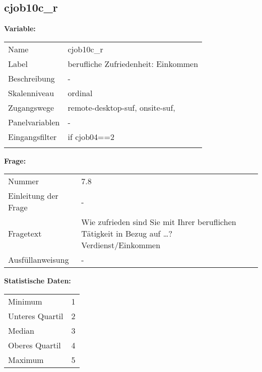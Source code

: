 	
	
	\subsection{cjob10c\_r}
	\label{subSection:cjob10c_r}

	\noindent\textbf{Variable:}\\
		\begin{tabular}{lL{11.3cm}}
			\label{tableVariable:cjob10c_r}
			Name & cjob10c\_r \\
			Label & berufliche Zufriedenheit: Einkommen \\
			Beschreibung & - \\
			Skalenniveau & ordinal \\
			Zugangswege &
				remote-desktop-suf,
				onsite-suf,
 \\
			Panelvariablen & -
			 \\
			Eingangsfilter & if cjob04==2 \\
 \\
		\end{tabular}

		\vspace*{1 cm}
		\noindent\textbf{Frage:}\\
		\begin{tabular}{lL{11.3cm}}
			\label{tableQuestion:cjob10c_r}
			Nummer & 7.8 \\
			Einleitung der Frage & - \\
			Fragetext & Wie zufrieden sind Sie mit Ihrer beruflichen Tätigkeit in Bezug auf …?
Verdienst/Einkommen \\
			Ausfüllanweisung & - \\
		\end{tabular}


		\vspace*{1 cm}
		\noindent\textbf{Statistische Daten:}\\
			\begin{tabular}{ll}
				\label{tableStatistics:cjob10c_r}
					Minimum & 1 \\
					Unteres Quartil & 2 \\
					Median & 3 \\
					Oberes Quartil & 4 \\
					Maximum & 5 \\
			\end{tabular}



